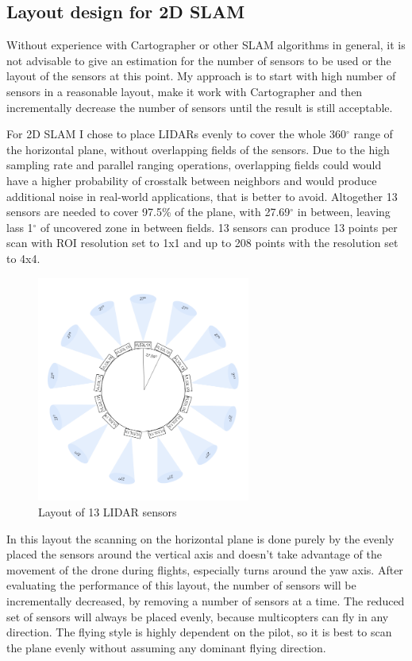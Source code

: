 \subsection{Layout design for 2D SLAM}
Without experience with Cartographer or other SLAM algorithms in general, it is not advisable to give an 
estimation for the number of sensors to be used or the layout of the sensors at this point. My approach 
is to start with high number of sensors in a reasonable layout, make it work with Cartographer and then
incrementally decrease the number of sensors until the result is still acceptable.

For 2D SLAM I chose to place LIDARs evenly to cover the whole 360$^{\circ}$ range of the horizontal plane, 
without overlapping fields of the sensors. Due to the high sampling rate and parallel ranging operations, 
overlapping fields could would have a higher probability of crosstalk between neighbors and would produce 
additional noise in real-world applications, that is better to avoid. Altogether 13 sensors are needed to 
cover 97.5\% of the plane, with 27.69$^{\circ}$ in between, leaving lass 1$^{\circ}$ of uncovered zone in 
between fields. 13 sensors can produce 13 points per scan with ROI resolution set to 1x1 and up to 208 
points with the resolution set to 4x4. 

\begin{figure}[ht]
    \centering
    \includegraphics[width=70mm, keepaspectratio]{figures/2d_slam_13sensors.png}
    \caption{Layout of 13 LIDAR sensors}
    \label{fig:2d_13sensor_layout}
\end{figure}

In this layout the scanning on the horizontal plane is done purely by the evenly placed the sensors 
around the vertical axis and doesn't take advantage of the movement of the drone during flights, especially 
turns around the yaw axis. After evaluating the performance of this layout, the number of sensors will be
incrementally decreased, by removing a number of sensors at a time. The reduced set of sensors will always
be placed evenly, because multicopters can fly in any direction. The flying style is highly dependent on the
pilot, so it is best to scan the plane evenly without assuming any dominant flying direction.

